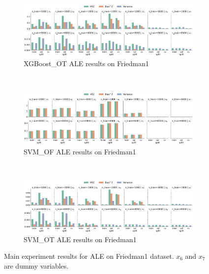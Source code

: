 \documentclass[runningheads]{llncs}
\begin{document}
\begin{figure}[ht]
    \centering
    \ContinuedFloat\
    \begin{subfigure}[b]{\textwidth}
        \centering
        \includegraphics[width=\textwidth]{img/Friedman1-all/feature_effect_errors_ale_XGBoost_OT.png}
        \caption{XGBoost\_OT ALE results on Friedman1}
    \end{subfigure}
    \\[10pt]
    \vfill
    \begin{subfigure}[b]{\textwidth}
        \centering
        \includegraphics[width=\textwidth]{img/Friedman1-all/feature_effect_errors_ale_SVM_OF.png}
        \caption{SVM\_OF ALE results on Friedman1}
    \end{subfigure}
    \\[10pt]
    \vfill
    \begin{subfigure}[b]{\textwidth}
        \centering
        \includegraphics[width=\textwidth]{img/Friedman1-all/feature_effect_errors_ale_SVM_OT.png}
        \caption{SVM\_OT ALE results on Friedman1}
    \end{subfigure}
    \caption{Main experiment results for ALE on Friedman1 dataset. $x_6$ and $x_7$ are dummy variables.}
    \label{fig:ale-results-friedman1}  %
\end{figure}
\end{document}
